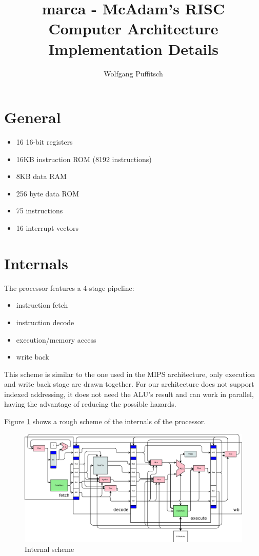 \documentclass[10pt, twoside, a4paper]{article}
\title{marca - McAdam's RISC Computer Architecture\\Implementation Details}
\author{Wolfgang Puffitsch}
\begin{document}
  \maketitle

  \section{General}
  
  \begin{itemize}
  \item 16 16-bit registers
  \item 16KB instruction ROM (8192 instructions)
  \item 8KB data RAM
  \item 256 byte data ROM
  \item 75 instructions
  \item 16 interrupt vectors
  \end{itemize}

  \section{Internals}

  The processor features a 4-stage pipeline:
  \begin{itemize}
  \item instruction fetch
  \item instruction decode
  \item execution/memory access
  \item write back
  \end{itemize}
  This scheme is similar to the one used in the MIPS architecture,
  only execution and write back stage are drawn together. For our
  architecture does not support indexed addressing, it does not need
  the ALU's result and can work in parallel, having the advantage of
  reducing the possible hazards.

  Figure \ref{fig:marca} shows a rough scheme of the internals of the
  processor.
  \begin{figure}[ht!]
    \centering
    \includegraphics[width=.95\textwidth]{marca}
    \caption{Internal scheme}
    \label{fig:marca}
  \end{figure}
\end{document}
